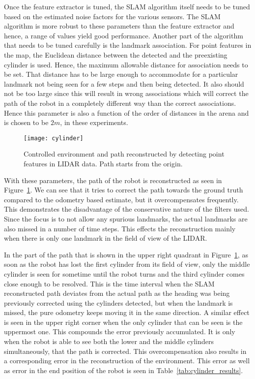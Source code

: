 Once the feature extractor is tuned, the SLAM algorithm itself needs to be tuned based on the estimated noise factors for the various sensors. The SLAM algorithm is more robust to these parameters than the feature extractor and hence, a range of values yield good performance. Another part of the algorithm that needs to be tuned carefully is the landmark association. For point features in the map, the Euclidean distance between the detected and the preexisting cylinder is used. Hence, the maximum allowable distance for association needs to be set. That distance has to be large enough to accommodate for a particular landmark not being seen for a few steps and then being detected. It also should not be too large since this will result in wrong associations which will correct the path of the robot in a completely different way than the correct associations. Hence this parameter is also a function of the order of distances in the arena and is chosen to be $ 2 m $, in these experiments.
\begin{figure}
\centering
\texttt{[image: cylinder]}
\caption{Controlled environment and path reconstructed by detecting point features in LIDAR data. Path starts from the origin.}
\label{fig:cylinder_result}
\end{figure}

With these parameters, the path of the robot is reconstructed as seen in Figure~\ref{fig:cylinder_result}. We can see that it tries to correct the path towards the ground truth compared to the odometry based estimate, but it overcompensates frequently. This demonstrates the disadvantage of the conservative nature of the filters used. Since the focus is to not allow any spurious landmarks, the actual landmarks are also missed in a number of time steps. This effects the reconstruction mainly when there is only one landmark in the field of view of the LIDAR. 

In the part of the path that is shown in the upper right quadrant in Figure~\ref{fig:cylinder_result}, as soon as the robot has lost the first cylinder from its field of view, only the middle cylinder is seen for sometime until the robot turns and the third cylinder comes close enough to be resolved. This is the time interval when the SLAM reconstructed path deviates from the actual path as the heading was being previously corrected using the cylinders detected, but when the landmark is missed, the pure odometry keeps moving it in the same direction. A similar effect is seen in the upper right corner when the only cylinder that can be seen is the uppermost one. This compounds the error previously accumulated. It is only when the robot is able to see both the lower and the middle cylinders simultaneously, that the path is corrected. This overcompensation also results in a corresponding error in the reconstruction of the environment. This error as well as error in the end position of the robot is seen in Table~\ref{tab:cylinder_results}.

